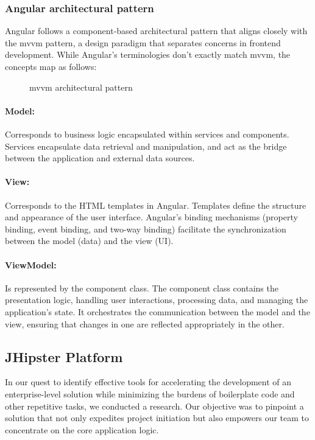 \subsubsection{Angular architectural pattern}

Angular follows a component-based architectural pattern that aligns closely with the
\acrfull{mvvm} pattern, a design paradigm that separates concerns in frontend
development. While Angular's terminologies don't exactly match \acrshort{mvvm},
the concepts map as follows: \\

\begin{figure}[hbt!]
      \centering
      
      \caption{\acrshort{mvvm} architectural pattern}
      \label{mvvm}
\end{figure}

\paragraph{Model:} Corresponds to business logic encapsulated within services and components.
Services encapsulate data retrieval and manipulation, and act as the bridge between
the application and external data sources.

\paragraph{View:} Corresponds to the HTML templates in Angular. Templates define the structure and
appearance of the user interface. Angular's binding mechanisms (property binding, event binding,
and two-way binding) facilitate the synchronization between the model (data) and the view (UI).

\paragraph{ViewModel:} Is represented by the component class. The component class contains
the presentation logic, handling user interactions, processing data, and managing the application's state.
It orchestrates the communication between the model and the view, ensuring that changes in one are
reflected appropriately in the other.

\subsection{JHipster Platform}
In our quest to identify effective tools for accelerating the development of an enterprise-level solution
while minimizing the burdens of boilerplate code and other repetitive tasks, we conducted a research.
Our objective was to pinpoint a solution that not only expedites project initiation but also empowers
our team to concentrate on the core application logic.

